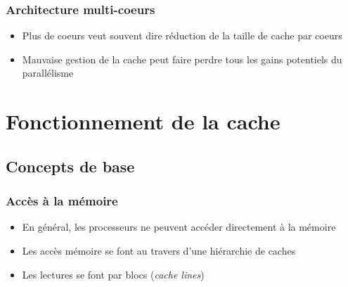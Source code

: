 \documentclass{beamer}
\begin{document}
\begin{frame}
\frametitle{Architecture multi-coeurs}
\begin{itemize}
\item Plus de coeurs veut souvent dire réduction de la taille de cache par coeurs
\item Mauvaise gestion de la cache peut faire perdre tous les gains potentiels du parallélisme
\end{itemize}
\end{frame}

\section{Fonctionnement de la cache}
\subsection{Concepts de base}
\begin{frame}
\frametitle{Accès à la mémoire}
\begin{itemize}
\item En général, les processeurs ne peuvent accéder directement à la mémoire
\item Les accès mémoire se font au travers d'une hiérarchie de caches
\item Les lectures se font par blocs (\textit{cache lines})
\end{itemize}
\end{frame}
\end{document}
